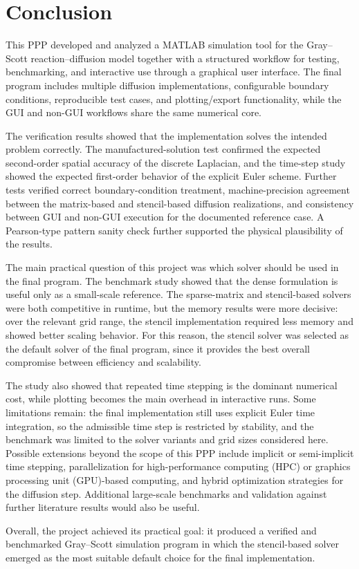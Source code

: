 \chapter{Conclusion}

This PPP developed and analyzed a MATLAB simulation tool for the Gray--Scott reaction--diffusion model together with a structured workflow for testing, benchmarking, and interactive use through a graphical user interface. The final program includes multiple diffusion implementations, configurable boundary conditions, reproducible test cases, and plotting/export functionality, while the GUI and non-GUI workflows share the same numerical core.

The verification results showed that the implementation solves the intended problem correctly. The manufactured-solution test confirmed the expected second-order spatial accuracy of the discrete Laplacian, and the time-step study showed the expected first-order behavior of the explicit Euler scheme. Further tests verified correct boundary-condition treatment, machine-precision agreement between the matrix-based and stencil-based diffusion realizations, and consistency between GUI and non-GUI execution for the documented reference case. A Pearson-type pattern sanity check further supported the physical plausibility of the results.

The main practical question of this project was which solver should be used in the final program. The benchmark study showed that the dense formulation is useful only as a small-scale reference. The sparse-matrix and stencil-based solvers were both competitive in runtime, but the memory results were more decisive: over the relevant grid range, the stencil implementation required less memory and showed better scaling behavior. For this reason, the stencil solver was selected as the default solver of the final program, since it provides the best overall compromise between efficiency and scalability.

The study also showed that repeated time stepping is the dominant numerical cost, while plotting becomes the main overhead in interactive runs. Some limitations remain: the final implementation still uses explicit Euler time integration, so the admissible time step is restricted by stability, and the benchmark was limited to the solver variants and grid sizes considered here. Possible extensions beyond the scope of this PPP include implicit or semi-implicit time stepping, parallelization for high-performance computing (HPC) or graphics processing unit (GPU)-based computing, and hybrid optimization strategies for the diffusion step. Additional large-scale benchmarks and validation against further literature results would also be useful.

Overall, the project achieved its practical goal: it produced a verified and benchmarked Gray--Scott simulation program in which the stencil-based solver emerged as the most suitable default choice for the final implementation.